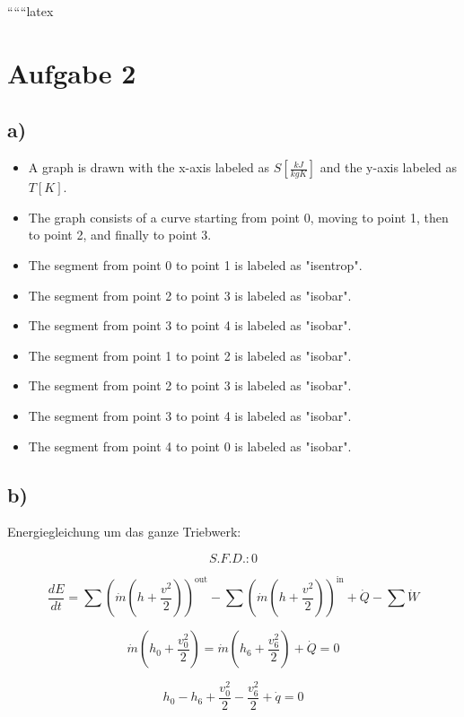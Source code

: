 
``````latex


\section*{Aufgabe 2}

\subsection*{a)}

\begin{itemize}
    \item A graph is drawn with the x-axis labeled as $S \left[ \frac{kJ}{kgK} \right]$ and the y-axis labeled as $T \left[ K \right]$.
    \item The graph consists of a curve starting from point 0, moving to point 1, then to point 2, and finally to point 3.
    \item The segment from point 0 to point 1 is labeled as "isentrop".
    \item The segment from point 2 to point 3 is labeled as "isobar".
    \item The segment from point 3 to point 4 is labeled as "isobar".
    \item The segment from point 1 to point 2 is labeled as "isobar".
    \item The segment from point 2 to point 3 is labeled as "isobar".
    \item The segment from point 3 to point 4 is labeled as "isobar".
    \item The segment from point 4 to point 0 is labeled as "isobar".
\end{itemize}

\subsection*{b)}

Energiegleichung um das ganze Triebwerk:

\[
S.F.D.: 0
\]

\[
\frac{dE}{dt} = \sum \left( \dot{m} \left( h + \frac{v^2}{2} \right) \right)^{\text{out}} - \sum \left( \dot{m} \left( h + \frac{v^2}{2} \right) \right)^{\text{in}} + \dot{Q} - \sum \dot{W}
\]

\[
\dot{m} \left( h_0 + \frac{v_0^2}{2} \right) = \dot{m} \left( h_6 + \frac{v_6^2}{2} \right) + \dot{Q} = 0
\]

\[
h_0 - h_6 + \frac{v_0^2}{2} - \frac{v_6^2}{2} + \dot{q} = 0
\]

